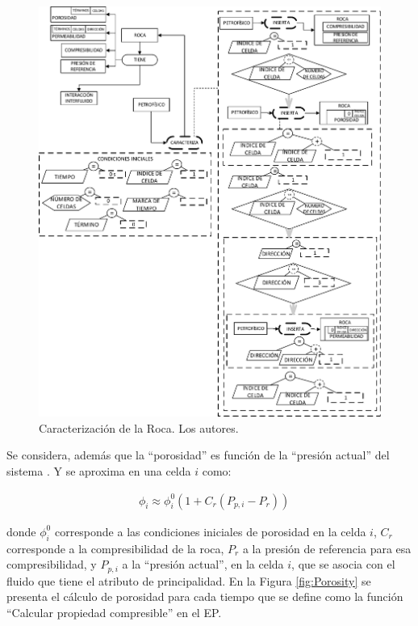\begin{figure}[h]
	\centering%
	\includegraphics[width=0.7\linewidth]{Fig/Rock.pdf}%
	\caption[Caracterización de la Roca.]{Caracterización de la Roca. Los autores.} \label{fig:Rock}
\end{figure}

Se considera, además que la ``porosidad'' es función de la ``presión actual'' del sistema \citep{chen2007reservoir}. Y se aproxima en una celda $i$ como:

\begin{align}
	\label{ec:porosity}&\phi_{i} \approx \phi^{0}_{i}\left( 1 + C_{r} \left(P_{p,i} - P_{r}\right) \right)
\end{align}

donde $\phi^{0}_{i}$ corresponde a las condiciones iniciales de porosidad en la celda $i$, $C_{r}$ corresponde a la compresibilidad de la roca, $P_{r}$ a la presión de referencia para esa compresibilidad, y $P_{p,i}$ a la ``presión actual'', en la celda $i$, que se asocia con el fluido que tiene el atributo de principalidad. En la Figura \ref{fig:Porosity} se presenta el cálculo de porosidad para cada tiempo que se define como la función ``Calcular propiedad compresible'' en el EP.

